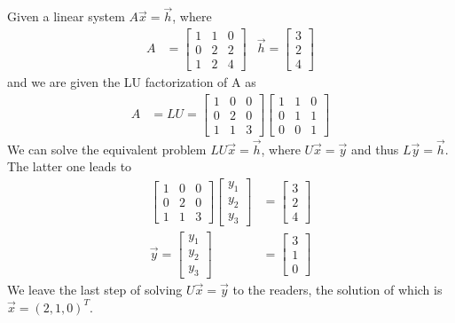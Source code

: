 \begin{exmp}
Given a linear system $A\vec{x} = \vec{h}$, where
\begin{align*}
A &= 
\begin{bmatrix}
1 & 1 & 0 \\
0 & 2 & 2 \\
1 & 2 & 4 
\end{bmatrix}
& \vec{h} = 
\begin{bmatrix}
3 \\
2 \\
4
\end{bmatrix}
\end{align*}
and we are given the LU factorization of A as
\begin{align*}
A &= LU = 
\begin{bmatrix}
1 & 0 & 0 \\
0 & 2 & 0 \\
1 & 1 & 3 
\end{bmatrix}
\begin{bmatrix}
1 & 1 & 0 \\
0 & 1 & 1 \\
0 & 0 & 1 
\end{bmatrix}
\end{align*}
We can solve the equivalent problem $LU\vec{x} = \vec{h}$, where $U\vec{x} = \vec{y}$ and thus $L\vec{y} = \vec{h}$. The latter one leads to
\begin{align*}
\begin{bmatrix}
1 & 0 & 0 \\
0 & 2 & 0 \\
1 & 1 & 3 
\end{bmatrix}
\begin{bmatrix}
y_1 \\
y_2 \\
y_3
\end{bmatrix}
&=
\begin{bmatrix}
3 \\
2 \\
4
\end{bmatrix} \\
\vec{y} = 
\begin{bmatrix}
y_1 \\
y_2 \\
y_3
\end{bmatrix}
&=
\begin{bmatrix}
3 \\
1 \\
0
\end{bmatrix}
\end{align*}
We leave the last step of solving $U\vec{x} = \vec{y}$ to the readers, the solution of which is $\vec{x} = (2,1,0)^T$.
\end{exmp}

